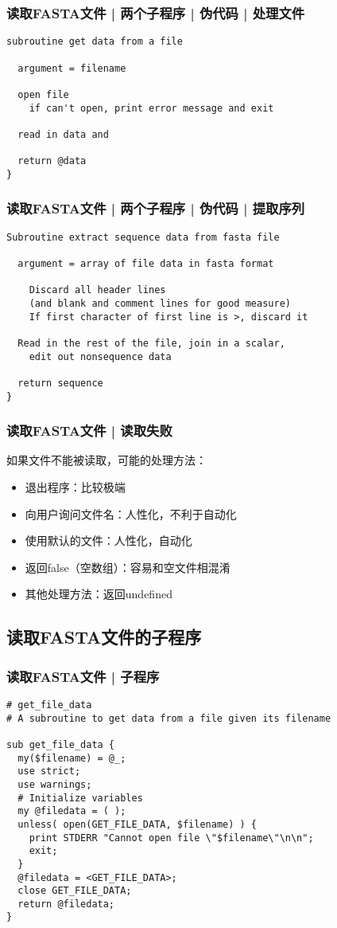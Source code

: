 \begin{frame}[fragile]
  \frametitle{读取FASTA文件 | 两个子程序 | 伪代码 | 处理文件}
\begin{lstlisting}
subroutine get data from a file

  argument = filename

  open file
    if can't open, print error message and exit

  read in data and 

  return @data
}
\end{lstlisting}
\end{frame}

\begin{frame}[fragile]
  \frametitle{读取FASTA文件 | 两个子程序 | 伪代码 | 提取序列}
\begin{lstlisting}[basicstyle=\small\tt]
Subroutine extract sequence data from fasta file

  argument = array of file data in fasta format

    Discard all header lines
    (and blank and comment lines for good measure)
    If first character of first line is >, discard it

  Read in the rest of the file, join in a scalar,
    edit out nonsequence data

  return sequence
}
\end{lstlisting}
\end{frame}

\begin{frame}
  \frametitle{读取FASTA文件 | \alert{读取失败}}
  如果文件不能被读取，可能的处理方法：
  \begin{itemize}
    \item 退出程序：比较极端
    \item 向用户询问文件名：人性化，不利于自动化
    \item 使用默认的文件：人性化，自动化
    \item 返回false（空数组）：容易和空文件相混淆
    \item 其他处理方法：返回undefined
  \end{itemize}
\end{frame}

\subsection{读取FASTA文件的子程序}
\begin{frame}[fragile]
  \frametitle{读取FASTA文件 | 子程序}
\begin{lstlisting}[firstnumber=1,basicstyle=\footnotesize\tt,numberstyle=\scriptsize]
# get_file_data
# A subroutine to get data from a file given its filename

sub get_file_data {
  my($filename) = @_;
  use strict;
  use warnings;
  # Initialize variables
  my @filedata = ( );
  unless( open(GET_FILE_DATA, $filename) ) {
    print STDERR "Cannot open file \"$filename\"\n\n";
    exit;
  }
  @filedata = <GET_FILE_DATA>;
  close GET_FILE_DATA;
  return @filedata;
}
\end{lstlisting}
\end{frame}

